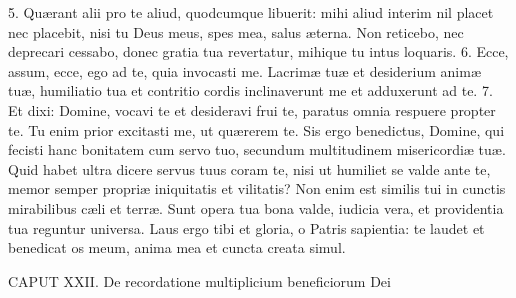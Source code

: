 \documentclass[twoside]{article}
\begin{document}
5. Quærant alii pro te aliud, quodcumque libuerit: mihi aliud interim nil placet nec placebit, nisi tu Deus meus, spes mea, salus æterna. Non reticebo, nec deprecari cessabo, donec gratia tua revertatur, mihique tu intus loquaris.
6. Ecce, assum, ecce, ego ad te, quia invocasti me. Lacrimæ tuæ et desiderium animæ tuæ, humiliatio tua et contritio cordis inclinaverunt me et adduxerunt ad te.
7. Et dixi: Domine, vocavi te et desideravi frui te, paratus omnia respuere propter te. Tu enim prior excitasti me, ut quærerem te. Sis ergo benedictus, Domine, qui fecisti hanc bonitatem cum servo tuo, secundum multitudinem misericordiæ tuæ. Quid habet ultra dicere servus tuus coram te, nisi ut humiliet se valde ante te, memor semper propriæ iniquitatis et vilitatis? Non enim est similis tui in cunctis mirabilibus cæli et terræ. Sunt opera tua bona valde, iudicia vera, et providentia tua reguntur universa. Laus ergo tibi et gloria, o Patris sapientia: te laudet et benedicat os meum, anima mea et cuncta creata simul.


CAPUT XXII.
De recordatione multiplicium beneficiorum Dei
\end{document}
